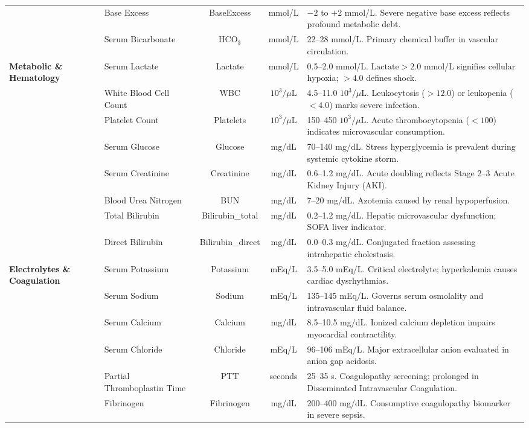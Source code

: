 \documentclass[journal,twocolumn,10pt]{IEEEtran}
\begin{document}
\begin{table}[!t]
{\begin{tabular}{llccp{9.2cm}}
& Base Excess & BaseExcess & mmol/L & $-2$ to $+2$ mmol/L. Severe negative base excess reflects profound metabolic debt. \\
& Serum Bicarbonate & $\text{HCO}_3$ & mmol/L & 22--28 mmol/L. Primary chemical buffer in vascular circulation. \\
\midrule
\multirow{8}{*}{\textbf{Metabolic \& Hematology}} 
& Serum Lactate & Lactate & mmol/L & 0.5--2.0 mmol/L. $\text{Lactate} > 2.0$ mmol/L signifies cellular hypoxia; $>4.0$ defines shock. \\
& White Blood Cell Count & WBC & $10^3/\mu\text{L}$ & 4.5--11.0 $10^3/\mu\text{L}$. Leukocytosis ($>12.0$) or leukopenia ($<4.0$) marks severe infection. \\
& Platelet Count & Platelets & $10^3/\mu\text{L}$ & 150--450 $10^3/\mu\text{L}$. Acute thrombocytopenia ($<100$) indicates microvascular consumption. \\
& Serum Glucose & Glucose & mg/dL & 70--140 mg/dL. Stress hyperglycemia is prevalent during systemic cytokine storm. \\
& Serum Creatinine & Creatinine & mg/dL & 0.6--1.2 mg/dL. Acute doubling reflects Stage 2--3 Acute Kidney Injury (AKI). \\
& Blood Urea Nitrogen & BUN & mg/dL & 7--20 mg/dL. Azotemia caused by renal hypoperfusion. \\
& Total Bilirubin & Bilirubin\_total & mg/dL & 0.2--1.2 mg/dL. Hepatic microvascular dysfunction; SOFA liver indicator. \\
& Direct Bilirubin & Bilirubin\_direct & mg/dL & 0.0--0.3 mg/dL. Conjugated fraction assessing intrahepatic cholestasis. \\
\midrule
\multirow{6}{*}{\textbf{Electrolytes \& Coagulation}} 
& Serum Potassium & Potassium & mEq/L & 3.5--5.0 mEq/L. Critical electrolyte; hyperkalemia causes cardiac dysrhythmias. \\
& Serum Sodium & Sodium & mEq/L & 135--145 mEq/L. Governs serum osmolality and intravascular fluid balance. \\
& Serum Calcium & Calcium & mg/dL & 8.5--10.5 mg/dL. Ionized calcium depletion impairs myocardial contractility. \\
& Serum Chloride & Chloride & mEq/L & 96--106 mEq/L. Major extracellular anion evaluated in anion gap acidosis. \\
& Partial Thromboplastin Time & PTT & seconds & 25--35 s. Coagulopathy screening; prolonged in Disseminated Intravascular Coagulation. \\
& Fibrinogen & Fibrinogen & mg/dL & 200--400 mg/dL. Consumptive coagulopathy biomarker in severe sepsis. \\

\end{tabular}}
\end{table}
\end{document}
